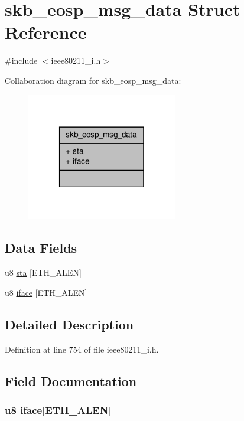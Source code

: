 \hypertarget{structskb__eosp__msg__data}{\section{skb\-\_\-eosp\-\_\-msg\-\_\-data Struct Reference}
\label{structskb__eosp__msg__data}
}


{\ttfamily \#include $<$ieee80211\-\_\-i.\-h$>$}



Collaboration diagram for skb\-\_\-eosp\-\_\-msg\-\_\-data\-:
\nopagebreak
\begin{figure}[H]
\begin{center}
\leavevmode
\includegraphics[width=186pt]{structskb__eosp__msg__data__coll__graph}
\end{center}
\end{figure}
\subsection*{Data Fields}
\begin{DoxyCompactItemize}
\item 
u8 \hyperlink{structskb__eosp__msg__data_add1dfd5a29b76978094290db59d1d19c}{sta} \mbox{[}E\-T\-H\-\_\-\-A\-L\-E\-N\mbox{]}
\item 
u8 \hyperlink{structskb__eosp__msg__data_af78ca47345f5661176509c303db21776}{iface} \mbox{[}E\-T\-H\-\_\-\-A\-L\-E\-N\mbox{]}
\end{DoxyCompactItemize}


\subsection{Detailed Description}


Definition at line 754 of file ieee80211\-\_\-i.\-h.



\subsection{Field Documentation}
\hypertarget{structskb__eosp__msg__data_af78ca47345f5661176509c303db21776}{
\subsubsection[{iface}]{\setlength{\rightskip}{0pt plus 5cm}u8 iface\mbox{[}E\-T\-H\-\_\-\-A\-L\-E\-N\mbox{]}}}\label{structskb__eosp__msg__data_af78ca47345f5661176509c303db21776}


